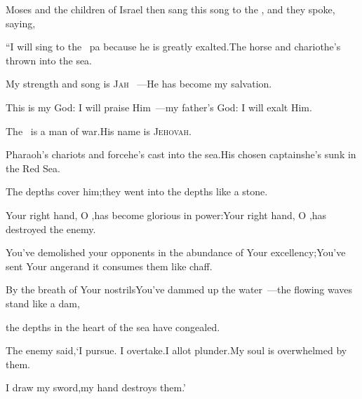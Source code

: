 
\begin{inparaenum}
   Moses and the children of Israel then sang this song to the \lord, and they spoke, saying,\smallskip%

  \pb{}``I will sing to the \lord\ pa because he is greatly exalted.\pa{}The horse and chariot\pa{}he's thrown into the sea.%

  \pa{} My strength and song is \textsc{Jah}%
  ~---\pa{}He has become my%
  salvation.%

  \pb{}This is my God: I will praise Him~---\pa{}my father's God: I will exalt Him.%

  \pa{} The \lord\ is a man%
  of war.\pa{}His name is \textsc{Jehovah}.%

  \pa{} Pharaoh's chariots and force\pa{}he's cast into the sea.\pa{}His chosen captains\pa{}he's sunk in the Red Sea.%

  \pa{} The depths cover him;\pa{}they went into the depths like a stone.%

  \pa{} Your right hand, O \lord,\pa{}has become glorious in power:\pa{}Your right hand, O \lord,\pa{}has destroyed the enemy.%

  \pa{} You've demolished your opponents in the abundance of Your excellency;\pa{}You've sent Your anger\pa{}and it consumes them like chaff.%

  \pa{} By the breath of Your nostrils\pa{}You've dammed up the water~---\pa{}the flowing waves stand like a dam,%

  \pb{}the depths in the heart of the sea have congealed.%

  \pb{} The enemy said,\pa{}`I pursue. I overtake.\pa{}I allot plunder.\pa{}My soul is overwhelmed by them.%

  \pb{}I draw my sword,\pa{}my hand destroys them.'%


\end{inparaenum}
